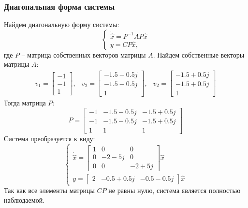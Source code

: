 \subsubsection{Диагональная форма системы}
Найдем диагональную форму системы:
\begin{equation}
    \begin{cases}
        \dot{\hat{x}} = P^{-1}AP\hat{x}\\
        y = CP\hat{x},
    \end{cases}
\end{equation}
где $P$ -- матрица собственных векторов матрицы $A$. Найдем собственные векторы матрицы $A$:
\begin{equation}
    \begin{array}{ccc}
        v_1 = \begin{bmatrix}
            -1 \\
            -1 \\
            1
        \end{bmatrix}, &
        v_2 = \begin{bmatrix}
            -1.5-0.5j \\
            -1.5-0.5j \\
            1
        \end{bmatrix}, &
        v_2 = \begin{bmatrix}
            -1.5+0.5j \\
            -1.5+0.5j \\
            1
        \end{bmatrix}
    \end{array}
\end{equation}
Тогда матрица $P$:
\begin{equation}
    P = \begin{bmatrix}
        -1 & -1.5-0.5j & -1.5+0.5j \\
        -1 & -1.5-0.5j & -1.5+0.5j \\
        1 & 1 & 1
    \end{bmatrix}
\end{equation}
Система преобразуется к виду: 
\begin{equation}
    \begin{cases}
        \dot{\hat{x}} = \begin{bmatrix}
            1 & 0 & 0 \\
            0 & -2-5j & 0 \\
            0 & 0 & -2+5j
        \end{bmatrix} \hat{x} \\ 
        y = \begin{bmatrix}
            2 & -0.5+0.5j & -0.5-0.5j
        \end{bmatrix} \hat{x}
    \end{cases}
\end{equation}
Так как все элементы матрицы $CP$ не равны нулю, система является полностью наблюдаемой. 

